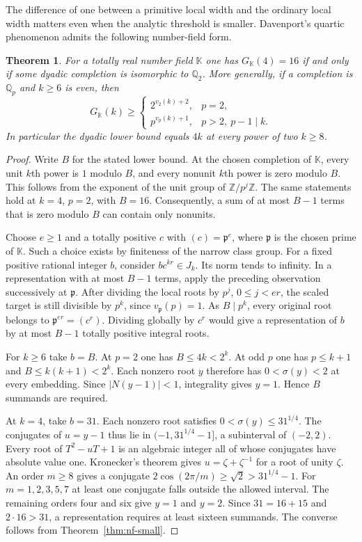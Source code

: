 \documentclass[11pt,letterpaper]{article}
\newtheorem{theorem}{Theorem}[section]
\theoremstyle{definition}
\numberwithin{equation}{section}
\begin{document}
The difference of one between a primitive local width and the
ordinary local width matters even when the analytic threshold is
smaller. Davenport's quartic phenomenon admits the following
number-field form.
\begin{theorem}\label{thm:nf-quartic-lower}
For a totally real number field $\mathbb K$ one has
$G_{\mathbb K}(4)=16$ if and only if some dyadic completion is
isomorphic to $\mathbb Q_2$.
More generally, if a completion is $\mathbb Q_p$ and $k\ge6$ is even,
then
\[
 G_{\mathbb K}(k)\ge
 \begin{cases}
 2^{v_2(k)+2},&p=2,\\
 p^{v_p(k)+1},&p>2,\ p-1\mid k .
 \end{cases}
\]
In particular the dyadic lower bound equals $4k$ at every power of
two $k\ge8$.
\end{theorem}
\begin{proof}
Write $B$ for the stated lower bound. At the chosen completion of
$\mathbb K$, every unit $k$th power is $1$ modulo $B$, and every
nonunit $k$th power is zero modulo $B$. This follows from the
exponent of the unit group of $\mathbb Z/p^j\mathbb Z$. The same
statements hold at $k=4$, $p=2$, with $B=16$.
Consequently, a sum of at most $B-1$ terms that is zero modulo $B$
can contain only nonunits.

Choose $e\ge1$ and a totally positive $c$ with
$(c)=\mathfrak p^e$, where $\mathfrak p$ is the chosen prime of
$\mathbb K$. Such a choice exists by finiteness of the narrow class
group. For a fixed positive rational integer $b$, consider
$bc^{kr}\in J_k$. Its norm tends to infinity. In a representation
with at most $B-1$ terms, apply the preceding observation
successively at $\mathfrak p$. After dividing the local roots by
$p^j$, $0\le j<er$, the scaled target is still divisible by $p^k$,
since $v_{\mathfrak p}(p)=1$. As $B\mid p^k$, every original root
belongs to $\mathfrak p^{er}=(c^r)$. Dividing globally by $c^r$
would give a representation of $b$ by at most $B-1$ totally
positive integral roots.

For $k\ge6$ take $b=B$. At $p=2$ one has $B\le4k<2^k$. At odd
$p$ one has $p\le k+1$ and $B\le k(k+1)<2^k$.
Each nonzero root $y$ therefore has $0<\sigma(y)<2$ at every
embedding. Since $|N(y-1)|<1$, integrality gives $y=1$. Hence $B$
summands are required.

At $k=4$, take $b=31$. Each nonzero root satisfies
$0<\sigma(y)\le31^{1/4}$. The conjugates of $u=y-1$ thus lie in
$(-1,31^{1/4}-1]$, a subinterval of $(-2,2)$. Every root of
$T^2-uT+1$ is an algebraic integer all of whose conjugates have
absolute value one. Kronecker's theorem gives
$u=\zeta+\zeta^{-1}$ for a root of unity $\zeta$. An order $m\ge8$
gives a conjugate $2\cos(2\pi/m)\ge\sqrt2>31^{1/4}-1$.
For $m=1,2,3,5,7$ at least one conjugate falls outside the allowed
interval. The remaining orders four and six give $y=1$ and $y=2$.
Since $31=16+15$ and $2\cdot16>31$, a representation requires at
least sixteen summands. The converse follows from
Theorem~\ref{thm:nf-small}.
\end{proof}
\end{document}

